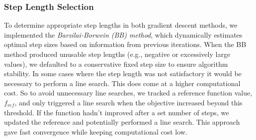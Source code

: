 \subsubsection{Step Length Selection}
To determine appropriate step lengths in both gradient descent methods, we implemented the \emph{Barzilai-Borwein (BB) method}, which dynamically estimates optimal step sizes based on information from previous iterations.
When the BB method produced unusable step lengths (e.g., negative or excessively large values), we defaulted to a conservative fixed step size to ensure algorithm stability.
In some cases where the step length was not satisfactory it would be necessary to perform a line search. This does come at a higher computational cost.
So to avoid unnecessary line searches, we tracked a reference function value, $f_{ref}$, and only triggered a line search when the objective increased beyond this threshold.
If the function hadn't improved after a set number of steps, we updated the reference and potentially performed a line search.
This approach gave fast convergence while keeping computational cost low.

